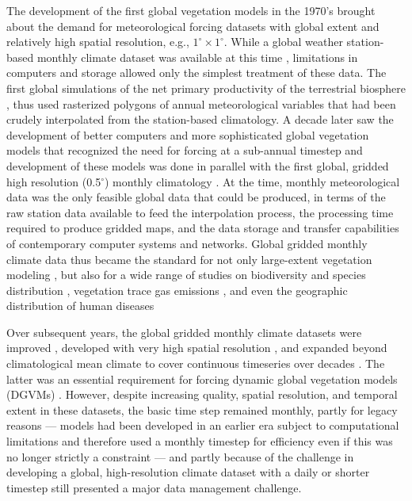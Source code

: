 \begin{refsection}
The development of the first global vegetation models in the 1970’s \citep[e.g.,][]{Lieth1975} brought about the demand for meteorological forcing datasets with global extent and relatively high spatial resolution, e.g., $1^{\circ}\times1^{\circ}$. While a global weather station-based monthly climate dataset was available at this time \citep{WalterLieth1967}, limitations in computers and storage allowed only the simplest treatment of these data. The first global simulations of the net primary productivity of the terrestrial biosphere \citep{Lieth1975}, thus used rasterized polygons of annual meteorological variables that had been crudely interpolated from the station-based climatology. A decade later saw the development of better computers and more sophisticated global vegetation models \citep{PrenticeCramerHarrisonEtAl1992, Prentice1989} that recognized the need for forcing at a sub-annual timestep and development of these models was done in parallel with the first global, gridded high resolution (0.5$^{\circ}$) monthly climatology \citep{LeemansCramer1991}. At the time, monthly meteorological data was the only feasible global data that could be produced, in terms of the raw station data available to feed the interpolation process, the processing time required to produce gridded maps, and the data storage and transfer capabilities of contemporary computer systems and networks. Global gridded monthly climate data thus became the standard for not only large-extent vegetation modeling \citep{HaxeltinePrentice1996a, HaxeltinePrenticeCreswell1996,KaplanBigelowPrenticeEtAl2003, KucharikFoleyDelireEtAl2000, WoodwardSmithEmanuel1995}, but also for a wide range of studies on biodiversity and species distribution \citep[e.g.,][]{ElithGrahamAndersonEtAl2006}, vegetation trace gas emissions \citep[e.g.,][]{GuentherHewittEricksonEtAl1995}, and even the geographic distribution of human diseases \citep[e.g.,][]{BhattGethingBradyEtAl2013}

Over subsequent years, the global gridded monthly climate datasets were improved \citep{NewHulmeJones1999,NewListerHulmeEtAl2002}, developed with very high spatial resolution \citep{HijmansCameronParraEtAl2005}, and expanded beyond climatological mean climate to cover continuous timeseries over decades \citep{HarrisJonesOsbornEtAl2014,MitchellJones2005,NewHulmeJones2000}. The latter was an essential requirement for forcing dynamic global vegetation models (DGVMs) \citep[e.g.,][]{SitchSmithPrenticeEtAl2003}. However, despite increasing quality, spatial resolution, and temporal extent in these datasets, the basic time step remained monthly, partly for legacy reasons --- models had been developed in an earlier era subject to computational limitations and therefore used a monthly timestep for efficiency even if this was no longer strictly a constraint --- and partly because of the challenge in developing a global, high-resolution climate dataset with a daily or shorter timestep still presented a major data management challenge.


\end{refsection}
